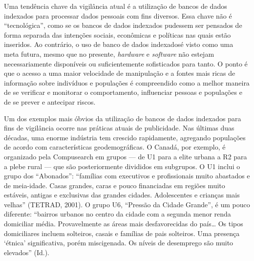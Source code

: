 Uma tendência chave da vigilância atual é a utilização de bancos de
dados indexados para processar dados pessoais com fins diversos. Essa
chave não é ``tecnológica'', como se os bancos de dados indexados
pudessem ser pensados de forma separada das intenções sociais,
econômicas e políticas nas quais estão inseridos. Ao contrário, o uso de
banco de dados indexadosé visto como uma meta futura, mesmo que no
presente, \emph{hardware} e \emph{software} não estejam necessariamente
disponíveis ou suficientemente sofisticados para tanto. O ponto é que o
acesso a uma maior velocidade de manipulação e a fontes mais ricas de
informação sobre indivíduos e populações é compreendido como a melhor
maneira de se verificar e monitorar o comportamento, influenciar pessoas
e populações e de se prever e antecipar riscos.

Um dos exemplos mais óbvios da utilização de bancos de dados indexados
para fins de vigilância ocorre nas práticas atuais de publicidade. Nas
últimas duas décadas, uma enorme indústria tem crescido rapidamente,
agregando populações de acordo com características geodemográficas. O
Canadá, por exemplo, é organizado pela Compusearch em grupos --- de U1
para a elite urbana a R2 para a plebe rural --- que são posteriormente
divididos em subgrupos. O U1 inclui o grupo dos ``Abonados'': ``famílias
com executivos e profissionais muito abastados e de meia-idade. Casas
grandes, caras e pouco financiadas em regiões muito estáveis, antigas e
exclusivas das grandes cidades. Adolescentes e crianças mais velhas''
(TETRAD, 2001). O grupo U6, ``Pressão da Cidade Grande'', é um pouco
diferente: ``bairros urbanos no centro da cidade com a segunda menor
renda domiciliar média. Provavelmente as áreas mais desfavorecidas do
país\ldots{} Os tipos domiciliares incluem solteiros, casais e famílias
de pais solteiros. Uma presença `étnica' significativa, porém
miscigenada. Os níveis de desemprego são muito elevados'' (Id.).

